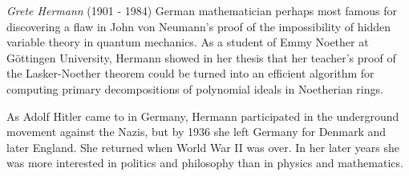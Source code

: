 \documentclass[12pt]{article}
\begin{document}
\emph{Grete Hermann} (1901 - 1984) German mathematician perhaps most famous for discovering a flaw in John von Neumann's proof of the impossibility of hidden variable theory in quantum mechanics. As a student of Emmy Noether at G\"ottingen University, Hermann showed in her thesis that her teacher's proof of the Lasker-Noether theorem could be turned into an efficient algorithm for computing primary decompositions of polynomial ideals in Noetherian rings.

As Adolf Hitler came to  in Germany, Hermann participated in the underground movement against the Nazis, but by 1936 she left Germany for Denmark and later England. She returned when World War II was over. In her later years she was more interested in politics and philosophy than in physics and mathematics.
\end{document}
